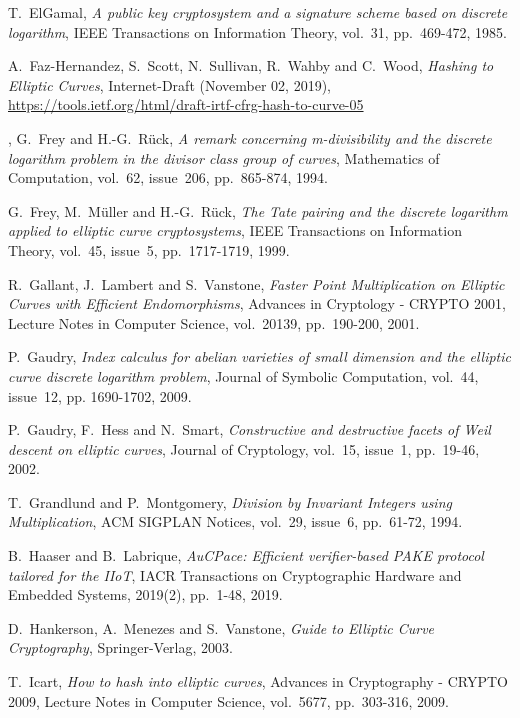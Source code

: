 \documentclass{llncs}
\begin{document}
\begin{thebibliography}{20}
T.~ElGamal,
\emph{A public key cryptosystem and a signature scheme based on discrete
logarithm},
IEEE Transactions on Information Theory, vol.~31, pp.~469-472, 1985.

A.~Faz-Hernandez, S.~Scott, N.~Sullivan, R.~Wahby and C.~Wood,
\emph{Hashing to Elliptic Curves},
Internet-Draft (November 02, 2019),\\
\url{https://tools.ietf.org/html/draft-irtf-cfrg-hash-to-curve-05}

,
G.~Frey and H.-G.~Rück,
\emph{A remark concerning m-divisibility and the discrete logarithm
problem in the divisor class group of curves},
Mathematics of Computation, vol.~62, issue~206, pp.~865-874, 1994.

G.~Frey, M.~Müller and H.-G.~Rück,
\emph{The Tate pairing and the discrete logarithm applied to elliptic
curve cryptosystems},
IEEE Transactions on Information Theory, vol.~45, issue~5,
pp.~1717-1719, 1999.

R.~Gallant, J.~Lambert and S.~Vanstone,
\emph{Faster Point Multiplication on Elliptic Curves with Efficient
Endomorphisms},
Advances in Cryptology - CRYPTO 2001, Lecture Notes in Computer Science,
vol.~20139, pp.~190-200, 2001.

P.~Gaudry,
\emph{Index calculus for abelian varieties of small dimension and the
elliptic curve discrete logarithm problem},
Journal of Symbolic Computation, vol.~44, issue~12, pp. 1690-1702, 2009.

P.~Gaudry, F.~Hess and N.~Smart,
\emph{Constructive and destructive facets of Weil descent on elliptic curves},
Journal of Cryptology, vol.~15, issue~1, pp.~19-46, 2002.

T.~Grandlund and P.~Montgomery,
\emph{Division by Invariant Integers using Multiplication},
ACM SIGPLAN Notices, vol.~29, issue~6, pp.~61-72, 1994.

B.~Haaser and B.~Labrique,
\emph{AuCPace: Efficient verifier-based PAKE protocol tailored for the IIoT},
IACR Transactions on Cryptographic Hardware and Embedded Systems, 2019(2),
pp.~1-48, 2019.

D.~Hankerson, A.~Menezes and S.~Vanstone,
\emph{Guide to Elliptic Curve Cryptography},
Springer-Verlag, 2003.

T.~Icart,
\emph{How to hash into elliptic curves},
Advances in Cryptography - CRYPTO 2009, Lecture Notes in Computer
Science, vol.~5677, pp.~303-316, 2009.


\end{thebibliography}
\end{document}
